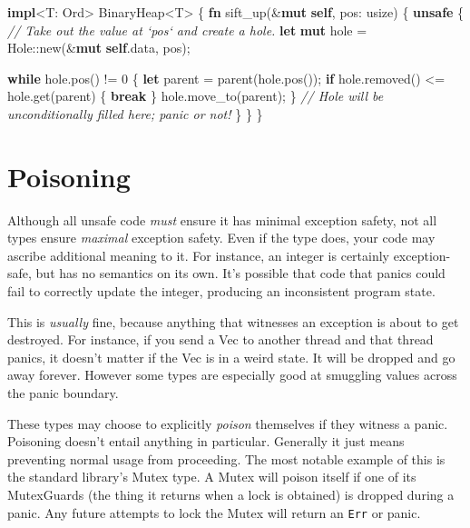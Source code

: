 \documentclass[a4paper,]{book}
\newenvironment{Shaded}{\begin{snugshade}}{\end{snugshade}}
\newcommand{\KeywordTok}[1]{\textcolor[rgb]{0.13,0.29,0.53}{\textbf{{#1}}}}
\newcommand{\DataTypeTok}[1]{\textcolor[rgb]{0.13,0.29,0.53}{{#1}}}
\newcommand{\DecValTok}[1]{\textcolor[rgb]{0.00,0.00,0.81}{{#1}}}
\newcommand{\CommentTok}[1]{\textcolor[rgb]{0.56,0.35,0.01}{\textit{{#1}}}}
\newcommand{\BuiltInTok}[1]{{#1}}
\newcommand{\NormalTok}[1]{{#1}}
\begin{document}
\begin{Shaded}
\begin{Highlighting}[]
\KeywordTok{impl}\NormalTok{<T: }\BuiltInTok{Ord}\NormalTok{> BinaryHeap<T> \{}
    \KeywordTok{fn} \NormalTok{sift_up(&}\KeywordTok{mut} \KeywordTok{self}\NormalTok{, pos: }\DataTypeTok{usize}\NormalTok{) \{}
        \KeywordTok{unsafe} \NormalTok{\{}
            \CommentTok{// Take out the value at `pos` and create a hole.}
            \KeywordTok{let} \KeywordTok{mut} \NormalTok{hole = Hole::new(&}\KeywordTok{mut} \KeywordTok{self}\NormalTok{.data, pos);}

            \KeywordTok{while} \NormalTok{hole.pos() != }\DecValTok{0} \NormalTok{\{}
                \KeywordTok{let} \NormalTok{parent = parent(hole.pos());}
                \KeywordTok{if} \NormalTok{hole.removed() <= hole.get(parent) \{ }\KeywordTok{break} \NormalTok{\}}
                \NormalTok{hole.move_to(parent);}
            \NormalTok{\}}
            \CommentTok{// Hole will be unconditionally filled here; panic or not!}
        \NormalTok{\}}
    \NormalTok{\}}
\NormalTok{\}}
\end{Highlighting}
\end{Shaded}

\section{Poisoning}\label{sec--poisoning}

Although all unsafe code \emph{must} ensure it has minimal exception
safety, not all types ensure \emph{maximal} exception safety. Even if
the type does, your code may ascribe additional meaning to it. For
instance, an integer is certainly exception-safe, but has no semantics
on its own. It's possible that code that panics could fail to correctly
update the integer, producing an inconsistent program state.

This is \emph{usually} fine, because anything that witnesses an
exception is about to get destroyed. For instance, if you send a Vec to
another thread and that thread panics, it doesn't matter if the Vec is
in a weird state. It will be dropped and go away forever. However some
types are especially good at smuggling values across the panic boundary.

These types may choose to explicitly \emph{poison} themselves if they
witness a panic. Poisoning doesn't entail anything in particular.
Generally it just means preventing normal usage from proceeding. The
most notable example of this is the standard library's Mutex type. A
Mutex will poison itself if one of its MutexGuards (the thing it returns
when a lock is obtained) is dropped during a panic. Any future attempts
to lock the Mutex will return an \texttt{Err} or panic.
\end{document}

